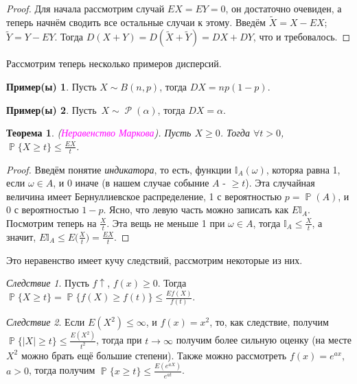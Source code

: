 \documentclass[a4paper,100pt]{article}
\theoremstyle{indented}
\newtheorem{theorem}{Теорема}
\theoremstyle{definition}
\newtheorem{exl}{Пример(ы)}
\theoremstyle{remark}
\newtheorem{cons}{Следствие}
\DeclareMathOperator{\PP}{\mathbb{P}}
\DeclareMathOperator{\Rho}{\mathcal{P}}
\begin{document}
\begin{proof}
  Для начала рассмотрим случай $EX=EY=0$, он достаточно очевиден, а теперь начнём сводить все остальные случаи к этому. Введём $\tilde{X}=X-EX$; $\tilde{Y}=Y-EY$. Тогда $D(X+Y)=D(\tilde{X}+\tilde{Y})=DX+DY$, что и требовалось.
\end{proof}

Рассмотрим теперь несколько примеров дисперсий.

\begin{exl}
  Пусть $X\sim B(n, p)$, тогда $DX=np(1-p)$. 
\end{exl}

\begin{exl}
  Пусть $X\sim \Rho(\alpha)$, тогда $DX = \alpha$. 
\end{exl}

\begin{theorem}  
  (\hypertarget{n15}{\textcolor{magenta}{\textit{Неравенство Маркова}}}). Пусть $X\geq 0$. Тогда $\forall t>0$, $\PP\{X \geq t\}\leq \frac{EX}{t}$.
\end{theorem}

\begin{proof}
  Введём понятие \textit{индикатора}, то есть, функции $\mathbb{I}_A(\omega)$, которяа равна 1, если $\omega \in A$, и 0 иначе (в нашем случае собыние $A$ - $\geq t$). Эта случайная величина имеет Бернуллиевское распределение, 1 с вероятностью $p=\PP(A)$, и 0 с вероятностью $1-p$. Ясно, что левую часть можно записать как $E\mathbb{I}_A$. Посмотрим теперь на $\frac{X}{t}$. Эта вещь не меньше 1 при $\omega \in A$, тогда $\mathbb{I}_A\leq \frac{X}{t}$, а значит, $E \mathbb{I}_A\leq E\biggl(\frac{X}{t}\biggr)=\frac{EX}{t}$. 
\end{proof}

Это неравенство имеет кучу следствий, рассмотрим некоторые из них.

\begin{cons}
  Пусть $f\uparrow$, $f(x)\geq 0$. Тогда $\PP\{X\geq t\}=\PP\{f(X)\geq f(t)\}\leq \frac{Ef(X)}{f(t)}$. 
\end{cons}

\begin{cons}
  Если $E(X^2)\leq \infty$, и $f(x)=x^2$, то, как следствие, получим $\PP\{|X|\geq t\}\leq \frac{E(X^2)}{t^2}$, тогда при $t\rightarrow \infty$ получим более сильную оценку (на месте $X^2$ можно брать ещё большие степени). Также можно рассмотреть $f(x)=e^{ax}$, $a>0$, тогда получим $\PP\{x\geq t\}\leq \frac{E(e^{aX})}{e^{at}}$. 
\end{cons}
\end{document}

